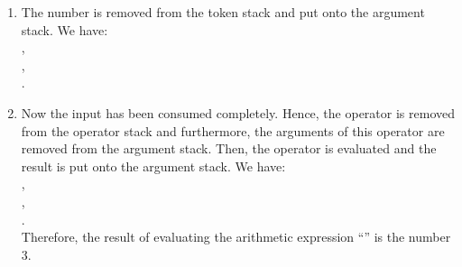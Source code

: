 \begin{enumerate}
\item The number  is removed from the token stack and put onto the argument stack. We have: \\[0.2cm]
      \hspace*{1.3cm} , \\[0.2cm]
      \hspace*{1.3cm} , \\[0.2cm]
      \hspace*{1.3cm} . 
\item Now the input has been consumed completely.
      Hence, the operator  is removed from the  operator stack and
      furthermore, the arguments of this operator are removed from the argument stack.  Then, the
      operator  is evaluated and the result is put onto the argument
      stack.  We have: \\[0.2cm]
      \hspace*{1.3cm} , \\[0.2cm]
      \hspace*{1.3cm} , \\[0.2cm]
      \hspace*{1.3cm} . \\[0.2cm]
      Therefore, the result of evaluating the arithmetic expression ``'' is the
      number 3.
\end{enumerate}

